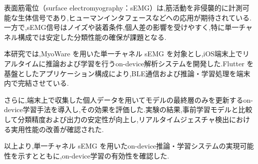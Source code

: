 表面筋電位（surface electromyography：sEMG）は,筋活動を非侵襲的に計測可能な生体信号であり,ヒューマンインタフェースなどへの応用が期待されている.一方で,sEMG信号はノイズや装着条件,個人差の影響を受けやすく,特に単一チャネル構成では安定した分類性能の確保が課題となる.

本研究では,MyoWare を用いた単一チャネル sEMG を対象とし,iOS端末上でリアルタイムに推論および学習を行うon-device解析システムを開発した.Flutter を基盤としたアプリケーション構成により,BLE通信および推論・学習処理を端末内で完結させている.

さらに,端末上で収集した個人データを用いてモデルの最終層のみを更新するon-device学習手法を導入し,その効果を評価した.実験の結果,事前学習モデルと比較して分類精度および出力の安定性が向上し,リアルタイムジェスチャ検出における実用性能の改善が確認された.

以上より,単一チャネル sEMG を用いたon-device推論・学習システムの実現可能性を示すとともに,on-device学習の有効性を確認した.